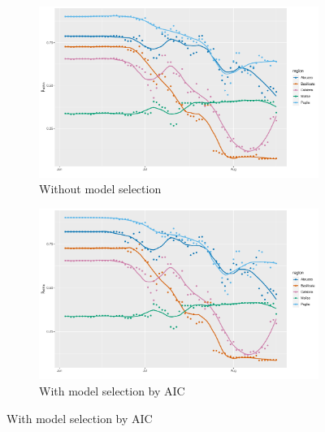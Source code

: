 \documentclass[12pt]{article}
\begin{document}
\begin{appendices}
		\begin{figure}[H]
    	    \centering
    	    \begin{subfigure}{\textwidth}
    	      \centering
    	      \includegraphics[width=0.95\linewidth]{output/model1_lag3_betawithin_Sud_rolling.pdf}
    	      \caption{Without model selection}
    	      \label{fig:beta_within_over_time_sud_regular}
    	    \end{subfigure}\newline
    	    \begin{subfigure}{\textwidth}
    	      \centering
    	      \includegraphics[width=0.95\linewidth]{output/model1_lag3_betawithin_Sud_aic_rolling.pdf}
    	      \caption{With model selection by AIC}
    	      \label{fig:beta_within_over_time_sud_aic}
    	    \end{subfigure}
    	\end{figure}
        \begin{figure}[H]\ContinuedFloat
    	    \begin{subfigure}{\textwidth}
    	      \centering

\end{subfigure}
\end{figure}
\end{appendices}
\end{document}

